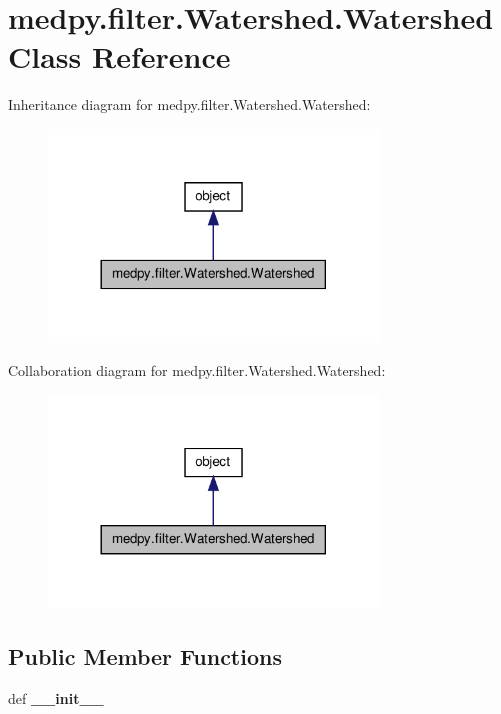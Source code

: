 \hypertarget{classmedpy_1_1filter_1_1Watershed_1_1Watershed}{
\section{medpy.filter.Watershed.Watershed Class Reference}
\label{classmedpy_1_1filter_1_1Watershed_1_1Watershed}
}


Inheritance diagram for medpy.filter.Watershed.Watershed:\nopagebreak
\begin{figure}[H]
\begin{center}
\leavevmode
\includegraphics[width=248pt]{classmedpy_1_1filter_1_1Watershed_1_1Watershed__inherit__graph}
\end{center}
\end{figure}


Collaboration diagram for medpy.filter.Watershed.Watershed:\nopagebreak
\begin{figure}[H]
\begin{center}
\leavevmode
\includegraphics[width=248pt]{classmedpy_1_1filter_1_1Watershed_1_1Watershed__coll__graph}
\end{center}
\end{figure}
\subsection*{Public Member Functions}
\begin{DoxyCompactItemize}
\item 
\hypertarget{classmedpy_1_1filter_1_1Watershed_1_1Watershed_a0c6de22d3f6c3ba4747ab27c24b20cb1}{
def {\bfseries \_\-\_\-init\_\-\_\-}}
\label{classmedpy_1_1filter_1_1Watershed_1_1Watershed_a0c6de22d3f6c3ba4747ab27c24b20cb1}

\end{DoxyCompactItemize}


